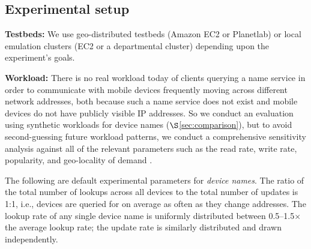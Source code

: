 \vspace{-0.1in}
\subsection{Experimental setup}

\textbf{Testbeds:} We use geo-distributed testbeds (Amazon EC2 or Planetlab) or local emulation clusters (EC2 or a departmental cluster) depending upon the experiment's goals. %


\textbf{Workload:} There is no real workload today of clients querying a name service in order to communicate with mobile devices frequently moving across different network addresses, both because such a name service does not exist and mobile devices do not have publicly visible IP addresses. So we conduct an evaluation using synthetic workloads for device names ($\S$\ref{sec:comparison}), but to avoid second-guessing future workload patterns, we conduct a comprehensive sensitivity analysis against all of the relevant parameters such as the read rate, write rate, popularity, and geo-locality of demand \cite{techreport}.


The following are default experimental parameters %
for {\em device names}. The ratio of the total number of lookups across all devices to the total number of updates is 1:1, i.e., devices are queried for on average as often as they change addresses. The lookup rate of any single device name is uniformly distributed between 0.5--1.5$\times$ the average lookup rate; the update rate is similarly distributed and drawn independently.%

